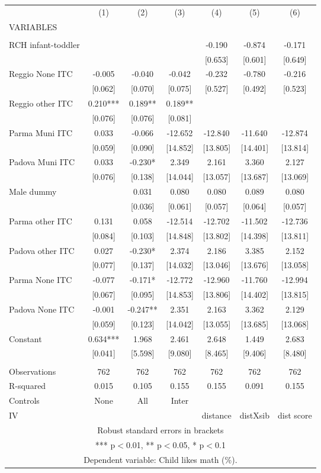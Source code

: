 \begin{tabular}{lcccccc} \hline
 & (1) & (2) & (3) & (4) & (5) & (6) \\
VARIABLES &  &  &  &  &  &  \\ \hline
 &  &  &  &  &  &  \\
RCH infant-toddler &  &  &  & -0.190 & -0.874 & -0.171 \\
 &  &  &  & [0.653] & [0.601] & [0.649] \\
Reggio None ITC & -0.005 & -0.040 & -0.042 & -0.232 & -0.780 & -0.216 \\
 & [0.062] & [0.070] & [0.075] & [0.527] & [0.492] & [0.523] \\
Reggio other ITC & 0.210*** & 0.189** & 0.189** &  &  &  \\
 & [0.076] & [0.076] & [0.081] &  &  &  \\
Parma Muni ITC & 0.033 & -0.066 & -12.652 & -12.840 & -11.640 & -12.874 \\
 & [0.059] & [0.090] & [14.852] & [13.805] & [14.401] & [13.814] \\
Padova Muni ITC & 0.033 & -0.230* & 2.349 & 2.161 & 3.360 & 2.127 \\
 & [0.076] & [0.138] & [14.044] & [13.057] & [13.687] & [13.069] \\
Male dummy &  & 0.031 & 0.080 & 0.080 & 0.089 & 0.080 \\
 &  & [0.036] & [0.061] & [0.057] & [0.064] & [0.057] \\
Parma other ITC & 0.131 & 0.058 & -12.514 & -12.702 & -11.502 & -12.736 \\
 & [0.084] & [0.103] & [14.848] & [13.802] & [14.398] & [13.811] \\
Padova other ITC & 0.027 & -0.230* & 2.374 & 2.186 & 3.385 & 2.152 \\
 & [0.077] & [0.137] & [14.032] & [13.046] & [13.676] & [13.058] \\
Parma None ITC & -0.077 & -0.171* & -12.772 & -12.960 & -11.760 & -12.994 \\
 & [0.067] & [0.095] & [14.853] & [13.806] & [14.402] & [13.815] \\
Padova None ITC & -0.001 & -0.247** & 2.351 & 2.163 & 3.362 & 2.129 \\
 & [0.059] & [0.123] & [14.042] & [13.055] & [13.685] & [13.068] \\
Constant & 0.634*** & 1.968 & 2.461 & 2.648 & 1.449 & 2.683 \\
 & [0.041] & [5.598] & [9.080] & [8.465] & [9.406] & [8.480] \\
 &  &  &  &  &  &  \\
Observations & 762 & 762 & 762 & 762 & 762 & 762 \\
R-squared & 0.015 & 0.105 & 0.155 & 0.155 & 0.091 & 0.155 \\
Controls & None & All & Inter &  &  &  \\
 IV &  &  &  & distance & distXsib & dist score \\ \hline
\multicolumn{7}{c}{ Robust standard errors in brackets} \\
\multicolumn{7}{c}{ *** p$<$0.01, ** p$<$0.05, * p$<$0.1} \\
\multicolumn{7}{c}{ Dependent variable: Child likes math (\%).} \\
\end{tabular}
